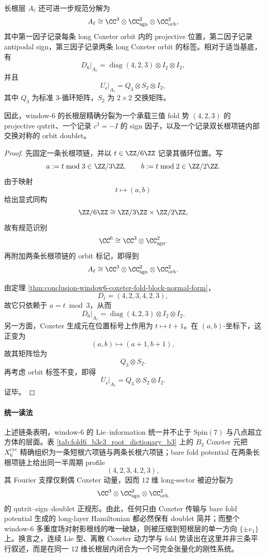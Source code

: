 \begin{theorem}\label{thm:conclusion-window6-qutrit-sign-doublet-normal-form}
长根层 \(A_{\ell}\) 还可进一步规范分解为
\[
A_{\ell}\cong \CC^3\otimes \CC^2_{\mathrm{sgn}}\otimes \CC^2_{\mathrm{orb}},
\]
其中第一因子记录每条 long Coxeter orbit 内的 projective 位置，第二因子记录 antipodal sign，第三因子记录两条 long Coxeter orbit 的标签。相对于适当基底，有
\[
D_6|_{A_{\ell}}=\operatorname{diag}(4,2,3)\otimes I_2\otimes I_2,
\]
并且
\[
U_{\mathfrak c}|_{A_{\ell}}=Q_3\otimes S_2\otimes I_2,
\]
其中 \(Q_3\) 为标准 \(3\)-循环矩阵，\(S_2\) 为 \(2\times 2\) 交换矩阵。

因此，window-\(6\) 的长根层精确分裂为一个承载三值 fold 势 \((4,2,3)\) 的 projective qutrit、一个记录 \(c^3=-I\) 的 sign 因子，以及一个记录双长根项链内部交换对称的 orbit doublet。
\end{theorem}
\begin{proof}
先固定一条长根项链，并以 \(t\in \ZZ/6\ZZ\) 记录其循环位置。写
\[
a:=t\bmod 3\in \ZZ/3\ZZ,\qquad
b:=t\bmod 2\in \ZZ/2\ZZ.
\]
由于映射
\[
t\longmapsto (a,b)
\]
给出显式同构
\[
\ZZ/6\ZZ\cong \ZZ/3\ZZ\times \ZZ/2\ZZ,
\]
故有规范识别
\[
\CC^6\cong \CC^3\otimes \CC^2_{\mathrm{sgn}}.
\]
再附加两条长根项链的 orbit 标记，即得到
\[
A_{\ell}\cong \CC^3\otimes \CC^2_{\mathrm{sgn}}\otimes \CC^2_{\mathrm{orb}}.
\]

由定理 \ref{thm:conclusion-window6-coxeter-fold-block-normal-form}，
\[
D_{\ell}=(4,2,3,4,2,3),
\]
故它只依赖于 \(a=t\bmod 3\)，从而
\[
D_6|_{A_{\ell}}=\operatorname{diag}(4,2,3)\otimes I_2\otimes I_2.
\]
另一方面，Coxeter 生成元在位置标号上作用为 \(t\mapsto t+1\)。在 \((a,b)\)-坐标下，这正变为
\[
(a,b)\longmapsto (a+1,b+1),
\]
故其矩阵恰为
\[
Q_3\otimes S_2.
\]
再考虑 orbit 标签不变，即得
\[
U_{\mathfrak c}|_{A_{\ell}}=Q_3\otimes S_2\otimes I_2.
\]
证毕。
\end{proof}

\paragraph{统一读法}
上述链条表明，window-\(6\) 的 Lie--information 统一并不止于 \(\mathrm{Spin}(7)\) 与八点超立方体的层面。表 \ref{tab:fold6_b3c3_root_dictionary_b3} 上的 \(B_3\) Coxeter 元把 \(X_6^{\mathrm{cyc}}\) 精确组织为一条短根六项链与两条长根六项链；bare fold potential 在两条长根项链上给出同一半周期 profile
\[
(4,2,3,4,2,3),
\]
其 Fourier 支撑仅剩偶 Coxeter 动量，因而 \(12\) 维 long-sector 被迫分裂为
\[
\CC^3\otimes \CC^2_{\mathrm{sgn}}\otimes \CC^2_{\mathrm{orb}}
\]
的 qutrit--sign--doublet 正规形。由此，任何只由 Coxeter 传输与 bare fold potential 生成的 long-layer Hamiltonian 都必然保有 doublet 简并；而整个 window-\(6\) 多重度场对射影根线的唯一破缺，则被压缩到短根层的单一方向 \(\{\pm e_1\}\) 上。换言之，连续 Lie 型、离散 Coxeter 动力学与 fold 势读出在这里并非三条平行叙述，而是在同一 \(12\) 维长根层内闭合为一个可完全张量化的刚性系统。

\endinput
